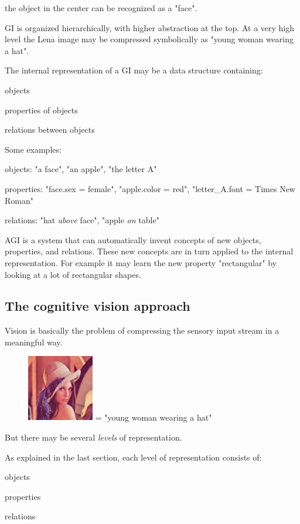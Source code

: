 the object in the center can be recognized as a "face".

GI is organized hierarchically, with higher abstraction at the top. At a very high level the Lena image may be compressed symbolically as "young woman wearing a hat".

The internal representation of a GI may be a data structure containing:
\begin{compactenum-}
	\item objects
	\item properties of objects
	\item relations between objects
\end{compactenum-}

Some examples:
\begin{compactenum-}
	\item objects: "a face", "an apple", "the letter A"
	\item properties: "face.sex = female", "apple.color = red", "letter\_A.font = Times New Roman"
	\item relations: "hat \emph{above} face", "apple \emph{on} table"
\end{compactenum-}

AGI is a system that can automatically invent concepts of new objects, properties, and relations. These new concepts are in turn applied to the internal representation. For example it may learn the new property "rectangular" by looking at a lot of rectangular shapes.

\subsection{The cognitive vision approach}

Vision is basically the problem of compressing the sensory input stream in a meaningful way.

\begin{figure}[H]
\centering
\includegraphics[scale=0.7]{Lena-Tiny.png} = "young woman wearing a hat"
\end{figure}

But there may be several \emph{levels} of representation.

As explained in the last section, each level of representation consists of:
\begin{compactenum-}
	\item objects
	\item properties
	\item relations
\end{compactenum-}

